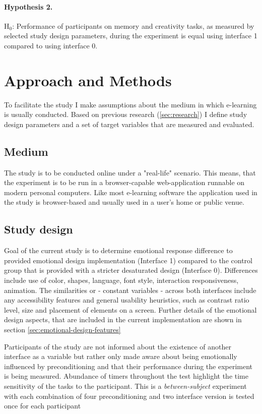 		\paragraph{Hypothesis 2.} H$_{0}$: Performance of participants on memory and creativity tasks, as measured by selected study design parameters, during the experiment is equal using interface 1 compared to using interface 0.

\section{Approach and Methods}

To facilitate the study I make assumptions about the medium in which e-learning is usually conducted. Based on previous research (\ref{sec:research}) I define study design parameters and a set of target variables that are measured and evaluated.

	\subsection{Medium}
	
	The study is to be conducted online under a "real-life" scenario. This means, that the experiment is to be run in a browser-capable web-application runnable on modern personal computers. Like most e-learning software the  application used in the study is browser-based and usually used in a user's home or public venue.
	
	\subsection{Study design} \label{sec:study-design}
	
	Goal of the current study is to determine emotional response difference to provided emotional design implementation (Interface 1) compared to the control group that is provided with a stricter desaturated design (Interface 0). Differences include use of color, shapes, language, font style, interaction responsiveness, animation. The similarities or - constant variables - across both interfaces include any accessibility features and general usability heuristics, such as contrast ratio level, size and placement of elements on a screen. Further details of the emotional design aspects, that are included in the current implementation are shown in section \ref{sec:emotional-design-features}
	
	Participants of the study are not informed about the existence of another interface as a variable but rather only made aware about being emotionally influenced by preconditioning and that their performance during the experiment is being measured. Abundance of timers throughout the test highlight the time sensitivity of the tasks to the participant. This is a \textit{between-subject} experiment with each combination of four preconditioning and two interface version is tested once for each participant
	
